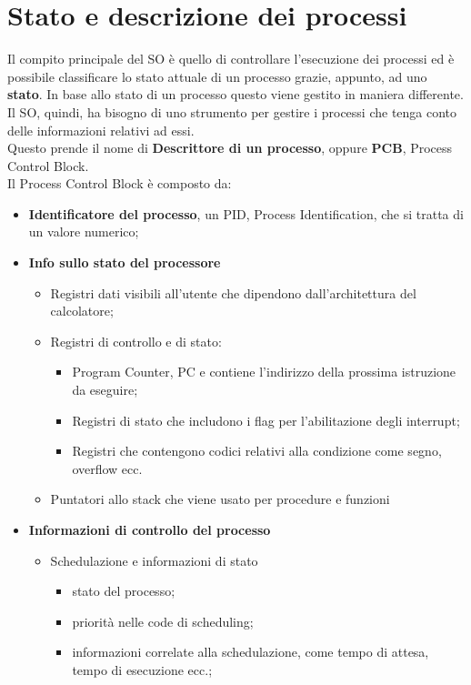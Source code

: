 \documentclass[12pt, letterpaper]{report}
\begin{document}
	\section{Stato e descrizione dei processi}
	Il compito principale del SO è quello di controllare l'esecuzione dei processi ed è possibile classificare lo stato attuale di un processo grazie, appunto, ad uno \textbf{stato}. In base allo stato di un processo questo viene gestito in maniera differente. \\
	Il SO, quindi, ha bisogno di uno strumento per gestire i processi che tenga conto delle informazioni relativi ad essi. \\
	Questo prende il nome di \textbf{Descrittore di un processo}, oppure \textbf{PCB}, Process Control Block. \\
	Il Process Control Block è composto da:
	\begin{itemize}
		\item \textbf{Identificatore del processo}, un PID, Process Identification, che si tratta di un valore numerico;
		\item \textbf{Info sullo stato del processore}
		\begin{itemize}
			\item Registri dati visibili all'utente che dipendono dall'architettura del calcolatore;
			\item Registri di controllo e di stato:
			\begin{itemize}
				\item Program Counter, PC e contiene l'indirizzo della prossima istruzione da eseguire;
				\item Registri di stato che includono i flag per l'abilitazione degli interrupt;
				\item Registri che contengono codici relativi alla condizione come segno, overflow ecc.
			\end{itemize}
			\item Puntatori allo stack che viene usato per procedure e funzioni
		\end{itemize}
		\item \textbf{Informazioni di controllo del processo}
			\begin{itemize}
				\item Schedulazione e informazioni di stato
				\begin{itemize}
					\item stato del processo;
					\item priorità nelle code di scheduling;
					\item informazioni correlate alla schedulazione, come tempo di attesa, tempo di esecuzione ecc.;

\end{itemize}
\end{itemize}
\end{itemize}
\end{document}
